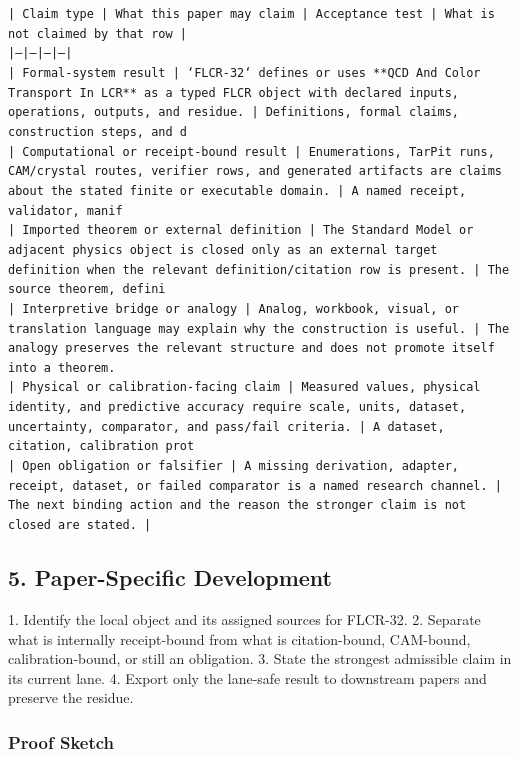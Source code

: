\documentclass[11pt]{article}
\begin{document}
\noindent\texttt{| Claim type | What this paper may claim | Acceptance test | What is not claimed by that row |}\\
\noindent\texttt{|---|---|---|---|}\\
\noindent\texttt{| Formal-system result | `FLCR-32` defines or uses **QCD And Color Transport In LCR** as a typed FLCR object with declared inputs, operations, outputs, and residue. | Definitions, formal claims, construction steps, and d}\\
\noindent\texttt{| Computational or receipt-bound result | Enumerations, TarPit runs, CAM/crystal routes, verifier rows, and generated artifacts are claims about the stated finite or executable domain. | A named receipt, validator, manif}\\
\noindent\texttt{| Imported theorem or external definition | The Standard Model or adjacent physics object is closed only as an external target definition when the relevant definition/citation row is present. | The source theorem, defini}\\
\noindent\texttt{| Interpretive bridge or analogy | Analog, workbook, visual, or translation language may explain why the construction is useful. | The analogy preserves the relevant structure and does not promote itself into a theorem. }\\
\noindent\texttt{| Physical or calibration-facing claim | Measured values, physical identity, and predictive accuracy require scale, units, dataset, uncertainty, comparator, and pass/fail criteria. | A dataset, citation, calibration prot}\\
\noindent\texttt{| Open obligation or falsifier | A missing derivation, adapter, receipt, dataset, or failed comparator is a named research channel. | The next binding action and the reason the stronger claim is not closed are stated. | }\\

\subsection*{5. Paper-Specific Development}

1. Identify the local object and its assigned sources for FLCR-32.
2. Separate what is internally receipt-bound from what is citation-bound, CAM-bound, calibration-bound, or still an obligation.
3. State the strongest admissible claim in its current lane.
4. Export only the lane-safe result to downstream papers and preserve the residue.

\subsubsection*{Proof Sketch}
\end{document}
